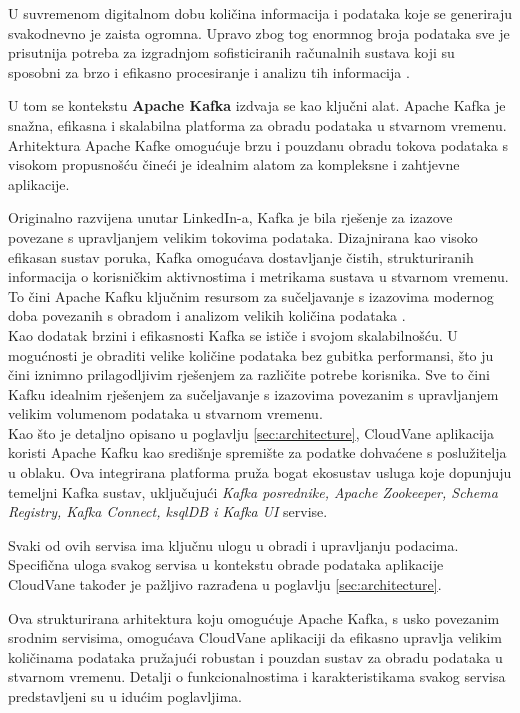 \documentclass[times, utf8, diplomski]{fer}
\begin{document}
U suvremenom digitalnom dobu količina informacija i podataka koje se generiraju svakodnevno je zaista ogromna. Upravo zbog tog enormnog broja podataka sve je prisutnija potreba za izgradnjom sofisticiranih računalnih sustava koji su sposobni za brzo i efikasno procesiranje i analizu tih informacija \citep{cubek_apache_2022}.

U tom se kontekstu \textbf{Apache Kafka} izdvaja se kao ključni alat. Apache Kafka je snažna, efikasna i skalabilna platforma za obradu podataka u stvarnom vremenu. Arhitektura Apache Kafke omogućuje brzu i pouzdanu obradu tokova podataka s visokom propusnošću čineći je idealnim alatom za kompleksne i zahtjevne aplikacije. 

Originalno razvijena unutar LinkedIn-a, Kafka je bila rješenje za izazove povezane s upravljanjem velikim tokovima podataka. Dizajnirana kao visoko efikasan sustav poruka, Kafka omogućava dostavljanje čistih, strukturiranih informacija o korisničkim aktivnostima i metrikama sustava u stvarnom vremenu. To čini Apache Kafku ključnim resursom za sučeljavanje s izazovima modernog doba povezanih s obradom i analizom velikih količina podataka \citep{shapira_kafka_2021}.\\

Kao dodatak brzini i efikasnosti Kafka se ističe i svojom skalabilnošću. U mogućnosti je obraditi velike količine podataka bez gubitka performansi, što ju čini iznimno prilagodljivim rješenjem za različite potrebe korisnika. Sve to čini Kafku idealnim rješenjem za sučeljavanje s izazovima povezanim s upravljanjem velikim volumenom podataka u stvarnom vremenu. \\

Kao što je detaljno opisano u poglavlju \ref{sec:architecture}, CloudVane aplikacija koristi Apache Kafku kao središnje spremište za podatke dohvaćene s poslužitelja u oblaku. Ova integrirana platforma pruža bogat ekosustav usluga koje dopunjuju temeljni Kafka sustav, uključujući \emph{Kafka posrednike, Apache Zookeeper, Schema Registry, Kafka Connect, ksqlDB i Kafka UI} servise.

Svaki od ovih servisa ima ključnu ulogu u obradi i upravljanju podacima. Specifična uloga svakog servisa u kontekstu obrade podataka aplikacije CloudVane također je pažljivo razrađena u poglavlju \ref{sec:architecture}.

Ova strukturirana arhitektura koju omogućuje Apache Kafka, s usko povezanim srodnim servisima, omogućava CloudVane aplikaciji da efikasno upravlja velikim količinama podataka pružajući robustan i pouzdan sustav za obradu podataka u stvarnom vremenu.
Detalji o funkcionalnostima i karakteristikama svakog servisa predstavljeni su u idućim poglavljima.
\end{document}

